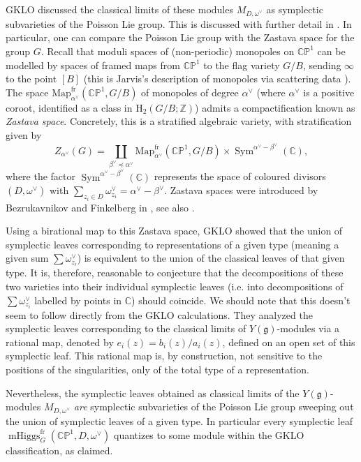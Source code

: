 \documentclass[11pt, oneside, reqno]{amsart}
\theoremstyle{definition} \newtheorem{definition}{Definition}[section]
\theoremstyle{definition} \newtheorem{remark}[definition]{Remark}
\theoremstyle{definition} \newtheorem{remarks}[definition]{Remarks}
\theoremstyle{definition} \newtheorem{question}[definition]{Question}
\theoremstyle{definition} \newtheorem*{note}{Note}
\theoremstyle{definition} \newtheorem{example}[definition]{Example}
\theoremstyle{definition} \newtheorem{examples}[definition]{Examples}
\renewcommand{\gg}{\mathfrak{g}}
\newcommand{\bb}[1]{\mathbb{#1}}
\newcommand{\mr}[1]{\mathrm{#1}}
\newcommand{\CC}{\mathbb{C}}
\newcommand{\ZZ}{\mathbb{Z}}
\DeclareMathOperator{\sym}{Sym}
\DeclareMathOperator{\mhiggs}{mHiggs}
\newcommand{\fr}{\mathrm{fr}}
\begin{document}
GKLO discussed the classical limits of these modules $M_{D,\omega^\vee}$ as symplectic subvarieties of the Poisson Lie group.  This is discussed with further detail in \cite[Section 4]{Shapiro}.  In particular, one can compare the Poisson Lie group with the Zastava space for the group $G$.  Recall that  moduli spaces of (non-periodic) monopoles on $\bb{CP}^1$ can be modelled by spaces of framed maps from $\bb{CP}^1$ to the flag variety $G/B$, sending $\infty$ to the point $[B]$ (this is Jarvis's description of monopoles via scattering data \cite{Jarvis}).  The space $\mr{Map}_{\alpha^\vee}^\fr(\bb{CP}^1, G/B)$ of monopoles of degree $\alpha^\vee$ (where $\alpha^\vee$ is a positive coroot, identified as a class in $\mr H_2(G/B;\ZZ)$) admits a compactification known as \emph{Zastava space}.  Concretely, this is a stratified algebraic variety, with stratification given by
\[Z_{\alpha^\vee}(G) = \coprod_{\beta^\vee \preceq \alpha^\vee} \mr{Map}_{\alpha^\vee}^\fr(\bb{CP}^1, G/B) \times \sym^{\alpha^\vee - \beta^\vee}(\CC),\]
where the factor $\sym^{\alpha^\vee - \beta^\vee}(\CC)$ represents the space of coloured divisors $(D, \omega^\vee)$ with $\sum_{z_i \in D} \omega^\vee_{z_i} = \alpha^\vee - \beta^\vee$.  Zastava spaces were introduced by Bezrukavnikov and Finkelberg in \cite{BezrukavnikovFinkelbergI}, see also \cite{BravermanICM}.

Using a birational map to this Zastava space, GKLO showed that the union of symplectic leaves corresponding to representations of a given type (meaning a given sum $\sum \omega^\vee_{z_i}$) is equivalent to the union of the classical leaves of that given type.  It is, therefore, reasonable to conjecture that the decompositions of these two varieties into their individual symplectic leaves (i.e. into decompositions of $\sum \omega^\vee_{z_i}$ labelled by points in $\CC$) should coincide.  We should note that this doesn't seem to follow directly from the GKLO calculations.  They analyzed the symplectic leaves corresponding to the classical limits of $Y(\gg)$-modules via a rational map, denoted by $e_i(z) = b_i(z)/a_i(z)$, defined on an open set of this symplectic leaf.  This rational map is, by construction, not sensitive to the positions of the singularities, only of the total type of a representation.

Nevertheless, the symplectic leaves obtained as classical limits of the $Y(\gg)$-modules $M_{D,\omega^\vee}$ \emph{are} symplectic subvarieties of the Poisson Lie group sweeping out the union of symplectic leaves of a given type.  In particular every symplectic leaf $\mhiggs^\fr_G(\bb{CP}^1,D,\omega^\vee)$ quantizes to some module within the GKLO classification, as claimed.
\end{document}
